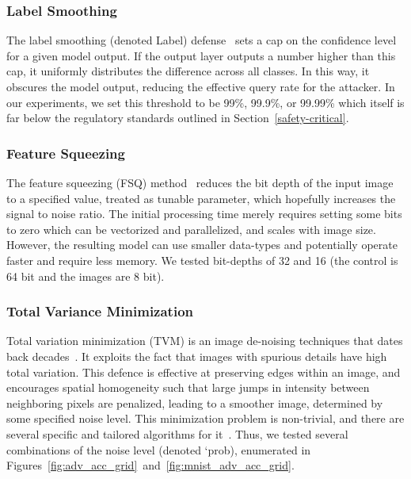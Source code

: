 \documentclass[journal]{IEEEtran}
\begin{document}



\subsubsection{Label Smoothing}
The label smoothing (denoted Label) defense~\cite{label_smoothing} sets a cap on the confidence level for a given model output. If the output layer outputs a number higher than this cap, it uniformly distributes the difference across all classes. In this way, it obscures the model output, reducing the effective query rate for the attacker. In our experiments, we set this threshold to be 99\%,  99.9\%,  or 99.99\% which itself is far below the regulatory standards outlined in Section~\ref{safety-critical}. 



\subsubsection{Feature Squeezing}
The feature squeezing (FSQ) method~\cite{feature_squeezing} reduces the bit depth of the input image to a specified value, treated as tunable parameter, which hopefully increases the signal to noise ratio. The initial processing time merely requires setting some bits to zero which can be vectorized and parallelized, and scales with image size. However, the resulting model can use smaller data-types and potentially operate faster and require less memory. We tested bit-depths of 32 and 16 (the control is 64 bit and the images are 8 bit). 

\subsubsection{Total Variance Minimization}
Total variation minimization (TVM) is an image de-noising techniques that dates back decades~\cite{rudin1992nonlinear}. It exploits the fact that images with spurious details have high total variation. This defence is effective at preserving edges within an image, and encourages spatial homogeneity such that large jumps in intensity between neighboring pixels are penalized, leading to a smoother image, determined by some specified noise level. This minimization problem is non-trivial, and there are several specific and tailored algorithms for it~\cite{chambolle2004algorithm,hadj2018continuation}. Thus, we tested several combinations of the noise level (denoted `prob),  enumerated in Figures~\ref{fig:adv_acc_grid}~and~\ref{fig:mnist_adv_acc_grid}.
\end{document}
